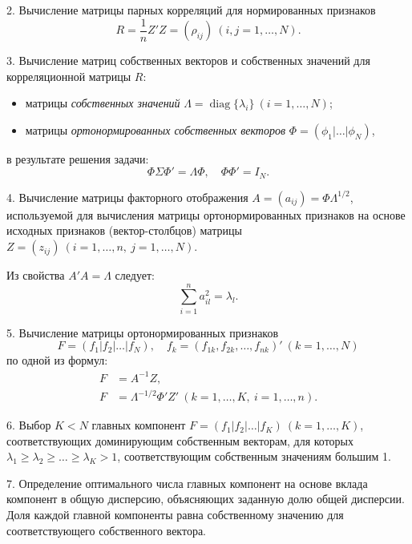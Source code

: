 \documentclass[14pt,a4paper]{extarticle}
\begin{document}
2. Вычисление матрицы парных корреляций для нормированных признаков
\begin{equation}
R = \frac{1}{n} Z' Z = (\rho_{ij})\ (i,j=1,\ldots,N).
\end{equation}

3. Вычисление матриц собственных векторов и собственных значений для корреляционной матрицы $R$:
\begin{itemize}
    \item матрицы \textit{собственных значений} $\Lambda = \operatorname{diag}\{\lambda_{i}\}\ (i=1,\ldots,N)$;
    \item матрицы \textit{ортонормированных собственных векторов} $\Phi = (\phi_{1}|\ldots|\phi_{N})$,
\end{itemize}
в результате решения задачи:
\begin{equation}
\Phi \Sigma \Phi' = \Lambda \Phi,\quad \Phi \Phi' = I_{N}.
\end{equation}

4. Вычисление матрицы факторного отображения $A = (a_{ij}) = \Phi \Lambda^{1/2}$, используемой для вычисления матрицы ортонормированных признаков на основе исходных признаков (вектор-столбцов) матрицы $Z = (z_{ij})\ (i=1,\ldots,n,\ j=1,\ldots,N)$.

Из свойства $A'A = \Lambda$ следует:
\begin{equation}
\sum_{i=1}^{n} a_{il}^{2} = \lambda_{l}.
\end{equation}

5. Вычисление матрицы ортонормированных признаков
\begin{equation}
F = (f_{1}|f_{2}|\ldots|f_{N}),\quad f_{k} = (f_{1k},f_{2k},\ldots,f_{nk})'\ (k=1,\ldots,N)
\end{equation}
по одной из формул:
\begin{align}
F &= A^{-1} Z,\\
F &= \Lambda^{-1/2} \Phi' Z'\ (k=1,\ldots,K,\ i=1,\ldots,n).
\end{align}

6. Выбор $K < N$ главных компонент $F = (f_{1}|f_{2}|\ldots|f_{K})\ (k=1,\ldots,K)$, соответствующих доминирующим собственным векторам, для которых $\lambda_{1} \geq \lambda_{2} \geq \ldots \geq \lambda_{K} > 1$, соответствующим собственным значениям большим 1.

7. Определение оптимального числа главных компонент на основе вклада компонент в общую дисперсию, объясняющих заданную долю общей дисперсии. Доля каждой главной компоненты равна собственному значению для соответствующего собственного вектора.
\end{document}
